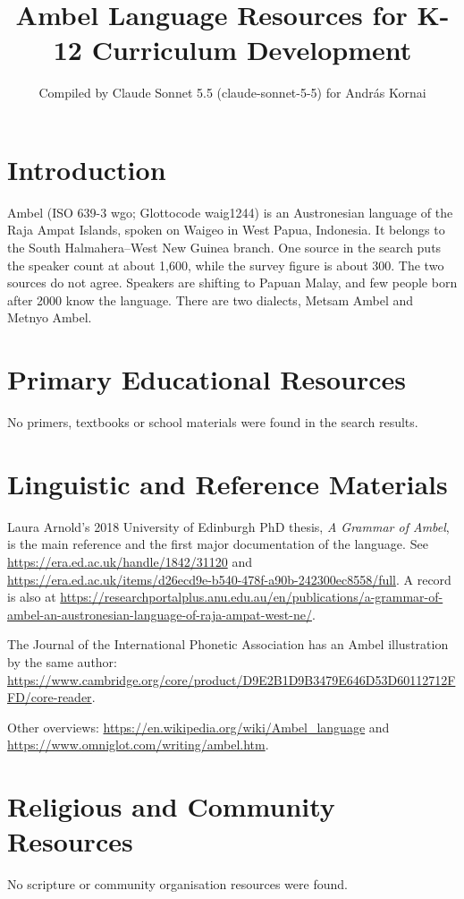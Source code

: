 \documentclass[12pt]{article}
\title{Ambel Language Resources for K-12 Curriculum Development}
\author{Compiled by Claude Sonnet 5.5 (claude-sonnet-5-5) for Andr\'as Kornai}
\date{}
\begin{document}
\maketitle

\section{Introduction}
Ambel (ISO 639-3 wgo; Glottocode waig1244) is an Austronesian language of the Raja Ampat Islands, spoken on Waigeo in West Papua, Indonesia. It belongs to the South Halmahera--West New Guinea branch. One source in the search puts the speaker count at about 1,600, while the survey figure is about 300. The two sources do not agree. Speakers are shifting to Papuan Malay, and few people born after 2000 know the language. There are two dialects, Metsam Ambel and Metnyo Ambel.

\section{Primary Educational Resources}
No primers, textbooks or school materials were found in the search results.

\section{Linguistic and Reference Materials}
Laura Arnold's 2018 University of Edinburgh PhD thesis, \emph{A Grammar of Ambel}, is the main reference and the first major documentation of the language. See \url{https://era.ed.ac.uk/handle/1842/31120} and \url{https://era.ed.ac.uk/items/d26ecd9e-b540-478f-a90b-242300ec8558/full}. A record is also at \url{https://researchportalplus.anu.edu.au/en/publications/a-grammar-of-ambel-an-austronesian-language-of-raja-ampat-west-ne/}.

The Journal of the International Phonetic Association has an Ambel illustration by the same author: \url{https://www.cambridge.org/core/product/D9E2B1D9B3479E646D53D60112712FFD/core-reader}.

Other overviews: \url{https://en.wikipedia.org/wiki/Ambel_language} and \url{https://www.omniglot.com/writing/ambel.htm}.

\section{Religious and Community Resources}
No scripture or community organisation resources were found.
\end{document}
